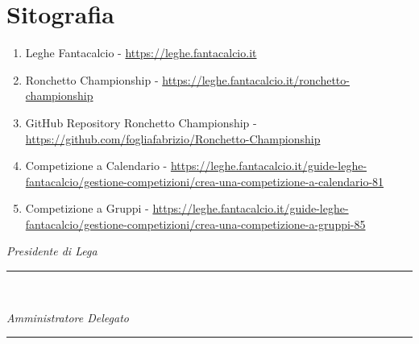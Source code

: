 \documentclass[12pt]{article}
\begin{document}
\section*{Sitografia}
\begin{enumerate}
    \item\label{leghe-fantacalcio} Leghe Fantacalcio - \url{https://leghe.fantacalcio.it}
    \item\label{ronchetto-championship} Ronchetto Championship - \url{https://leghe.fantacalcio.it/ronchetto-championship}
    \item\label{repository-ronchetto-championship} GitHub Repository Ronchetto Championship - \url{https://github.com/fogliafabrizio/Ronchetto-Championship}
    \item\label{competizione-a-calendario} Competizione a Calendario - \url{https://leghe.fantacalcio.it/guide-leghe-fantacalcio/gestione-competizioni/crea-una-competizione-a-calendario-81}
    \item\label{competizione-a-gruppi} Competizione a Gruppi - \url{https://leghe.fantacalcio.it/guide-leghe-fantacalcio/gestione-competizioni/crea-una-competizione-a-gruppi-85}
\end{enumerate}

\newpage
\thispagestyle{empty} %
\begin{flushright}

    \vspace*{\fill}
    \textit{Presidente di Lega}
    \vspace{0.5cm} %
    \rule{6cm}{0.4pt} \ %
    
    \textit{Amministratore Delegato}
    \vspace{0.5cm} %
    \rule{6cm}{0.4pt} \ %
    
\end{flushright}
\end{document}

